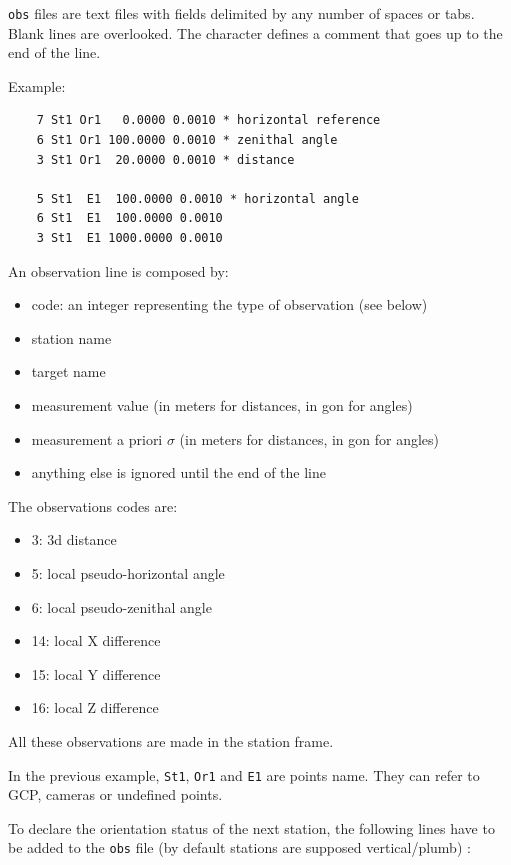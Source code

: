 {\tt obs} files are text files with fields delimited by any number of spaces or tabs. Blank lines are overlooked.
The {\tt *} character defines a comment that goes up to the end of the line.

Example:

\begin{verbatim}
    7 St1 Or1   0.0000 0.0010 * horizontal reference
    6 St1 Or1 100.0000 0.0010 * zenithal angle
    3 St1 Or1  20.0000 0.0010 * distance

    5 St1  E1  100.0000 0.0010 * horizontal angle
    6 St1  E1  100.0000 0.0010
    3 St1  E1 1000.0000 0.0010
\end{verbatim}

An observation line is composed by:

\begin{itemize}
    \item code: an integer representing the type of observation (see below)
    \item station name
    \item target name
    \item measurement value (in meters for distances, in gon for angles)
    \item measurement a priori $\sigma$ (in meters for distances, in gon for angles)
    \item anything else is ignored until the end of the line
\end{itemize}

The observations codes are:

\begin{itemize}
    \item 3: 3d distance
    \item 5: local pseudo-horizontal angle
    \item 6: local pseudo-zenithal angle
    \item 14: local X difference
    \item 15: local Y difference
    \item 16: local Z difference
\end{itemize}

All these observations are made in the station frame.

In the previous example, {\tt St1}, {\tt Or1} and {\tt E1} are points name.
They can refer to GCP, cameras or undefined points.

To declare the orientation status of the next station, the following lines have to be
added to the {\tt obs} file (by default stations are supposed vertical/plumb) :


